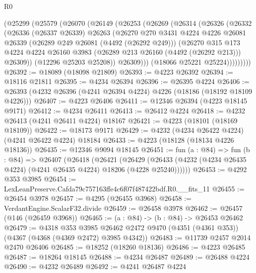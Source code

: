 \begin{lexlean}{R0}
\begin{coremodule}
        (@25299
          (@25579
            (@26070
              (@26149
                (@26253
                  (@26269
                    (@26314
                      (@26326
                        (@26332
                          (@26336
                            (@26337 @26339)
                            @26263
                            (@26270
                              @270
                              @3431
                              @4224
                              @4226
                              @26081
                              @26339
                              (@26289 @249 @26081 (@4492 (@26292 @249)))
                              (@26270
                                @315
                                @173
                                @4224
                                @4224
                                @26160
                                @3983
                                (@26289 @213 @26160 (@4492 (@26292 @213)))
                                @26309))
                            (@12296 @25203 @25208))
                          @26309)))
                    (@18066 @25221 @25224)))))))))
@26392 := @18089 (@18098 @21809)
@26393 := @4223 @26392
@26394 := @18116 @21811
@26395 := @4234 @26394
@26396 := @26395 @4224
@26406 := @26393 (@4232 @26396 (@4241 @26394 @4224) @4226 (@18186 (@18192 @18109 @4226)))
@26407 := @4223 @26406
@26411 := @12346 @26394 (@4223 @18145 @9171)
@26412 := @4234 @26411
@26413 := @26412 @4224
@26418 := @4232 @26413 (@4241 @26411 @4224) @18167
@26421 := @4223 (@18101 (@18169 @18109))
@26422 := @18173 @9171
@26429 := @4232 (@4234 @26422 @4224) (@4241 @26422 @4224) @18184
@26433 := @4223 (@18128 (@18134 @4226 @18136))
@26435 := @12346 @9094 @18145
@26451 := fun (a : @84) =>
  fun (b : @84) =>
  @26407
    (@26418
      (@26421
        (@26429 (@26433 (@4232 (@4234 @26435 @4224) (@4241 @26435 @4224) @18206 (@4228 @25240))))))
@26453 := @4292 @353 @3985
@26454 := LexLeanPreserve.Cafda79c757163ffe4c6f07f487422bdf.R0.__fits_11
@26455 := @26454 @3978
@26457 := @4295 (@26455 @3968)
@26458 := VerdantEngine.ScalarF32.divide
@26459 := @26458 @3978
@26462 := @26457 (@146 (@26459 @3968))
@26465 := (a : @84) -> (b : @84) -> @26453 @26462
@26479 := @4318
    @353
    @3985
    @26462
    @2472
    @9470
    (@4351 (@4361 @353))
    (@4367 (@4368 (@4369 @2472) @3985 @4342))
@26483 := @11739 @2457 @2014 @2470 @26406
@26485 := @18252 (@18260 @18136)
@26486 := @4223 @26485
@26487 := @18264 @18145
@26488 := @4234 @26487
@26489 := @26488 @4224
@26490 := @4232 @26489
@26492 := @4241 @26487 @4224

\end{coremodule}
\end{lexlean}
